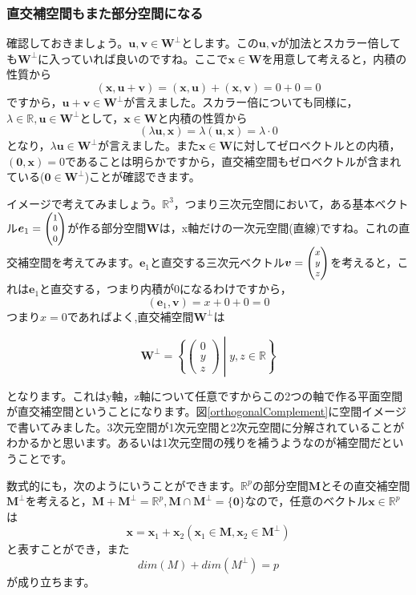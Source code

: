 \documentclass{ltjsbook}
\begin{document}
\subsubsection{直交補空間もまた部分空間になる}
確認しておきましょう。$\bm{u},\bm{v} \in \bm{W}^{\perp}$とします。この$\bm{u},\bm{v}$が加法とスカラー倍しても$\bm{W}^{\perp}$に入っていれば良いのですね。ここで$\bm{x} \in \bm{W}$を用意して考えると，内積の性質から
\[ (\bm{x},\bm{u}+\bm{v})=(\bm{x},\bm{u}) + (\bm{x},\bm{v}) = 0+0=0\]
ですから，$\bm{u}+\bm{v} \in \bm{W}^{\perp}$が言えました。スカラー倍についても同様に，$\lambda \in \mathbb{R},\bm{u}\in \bm{W}^{\perp}$として，$\bm{x} \in \bm{W}$と内積の性質から
\[ (\lambda\bm{u},\bm{x}) = \lambda(\bm{u},\bm{x}) = \lambda \cdot 0\]
となり，$\lambda\bm{u} \in \bm{W}^{\perp}$が言えました。また$\bm{x} \in \bm{W}$に対してゼロベクトルとの内積，$(\bm{0},\bm{x}) = 0$であることは明らかですから，直交補空間もゼロベクトルが含まれている($\bm{0} \in \bm{W}^{\perp}$)ことが確認できます。


イメージで考えてみましょう。$\mathbb{R}^3$，つまり三次元空間において，ある基本ベクトル$\bm{e}_1=\footnotesize\begin{pmatrix}1\\0\\0\end{pmatrix}$が作る部分空間$\bm{W}$は，x軸だけの一次元空間(直線)ですね。これの直交補空間を考えてみます。$\bm{e}_1$と直交する三次元ベクトル$\bm{v} = \footnotesize\begin{pmatrix}x \\ y \\ z\end{pmatrix}$を考えると，これは$\bm{e}_1$と直交する，つまり内積が0になるわけですから，
\[ (\bm{e}_1,\bm{v}) = x + 0 + 0 = 0\]
つまり$x=0$であればよく,直交補空間$\bm{W}^{\perp}$は

\[ \bm{W}^{\perp} = \left \{ \begin{pmatrix}0 \\ y \\z\end{pmatrix} \middle | y,z \in \mathbb{R} \right \} \]

となります。これはy軸，z軸について任意ですからこの2つの軸で作る平面空間が直交補空間ということになります。図\ref{orthogonalComplement}に空間イメージで書いてみました。3次元空間が1次元空間と2次元空間に分解されていることがわかるかと思います。あるいは1次元空間の残りを補うようなのが補空間だということです。

数式的にも，次のようにいうことができます。$\mathbb{R}^{p}$の部分空間$\bm{M}$とその直交補空間$\bm{M}^{\perp}$を考えると，$\bm{M}+\bm{M}^{\perp} = \mathbb{R}^p, \bm{M}\cap\bm{M}^{\perp} = \{\bm{0}\}$なので，任意のベクトル$\bm{x} \in \mathbb{R}^p$は
\[\bm{x}=\bm{x}_1+\bm{x}_2(\bm{x}_1 \in \bm{M},\bm{x}_2 \in \bm{M}^{\perp}) \]
と表すことができ，また
\[ dim (M) + dim (M^{\perp})= p \]
が成り立ちます。
\end{document}
